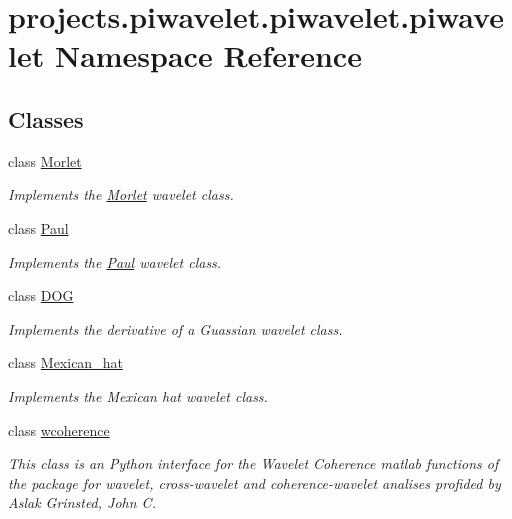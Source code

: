 \hypertarget{namespaceprojects_1_1piwavelet_1_1piwavelet_1_1piwavelet}{\section{projects.\-piwavelet.\-piwavelet.\-piwavelet Namespace Reference}
\label{namespaceprojects_1_1piwavelet_1_1piwavelet_1_1piwavelet}
}
\subsection*{Classes}
\begin{DoxyCompactItemize}
\item 
class \hyperlink{classprojects_1_1piwavelet_1_1piwavelet_1_1piwavelet_1_1Morlet}{Morlet}
\begin{DoxyCompactList}\small\item\em Implements the \hyperlink{classprojects_1_1piwavelet_1_1piwavelet_1_1piwavelet_1_1Morlet}{Morlet} wavelet class. \end{DoxyCompactList}\item 
class \hyperlink{classprojects_1_1piwavelet_1_1piwavelet_1_1piwavelet_1_1Paul}{Paul}
\begin{DoxyCompactList}\small\item\em Implements the \hyperlink{classprojects_1_1piwavelet_1_1piwavelet_1_1piwavelet_1_1Paul}{Paul} wavelet class. \end{DoxyCompactList}\item 
class \hyperlink{classprojects_1_1piwavelet_1_1piwavelet_1_1piwavelet_1_1DOG}{D\-O\-G}
\begin{DoxyCompactList}\small\item\em Implements the derivative of a Guassian wavelet class. \end{DoxyCompactList}\item 
class \hyperlink{classprojects_1_1piwavelet_1_1piwavelet_1_1piwavelet_1_1Mexican__hat}{Mexican\-\_\-hat}
\begin{DoxyCompactList}\small\item\em Implements the Mexican hat wavelet class. \end{DoxyCompactList}\item 
class \hyperlink{classprojects_1_1piwavelet_1_1piwavelet_1_1piwavelet_1_1wcoherence}{wcoherence}
\begin{DoxyCompactList}\small\item\em This class is an Python interface for the Wavelet Coherence matlab functions of the package for wavelet, cross-\/wavelet and coherence-\/wavelet analises profided by Aslak Grinsted, John C. \end{DoxyCompactList}\item 

\end{DoxyCompactItemize}
